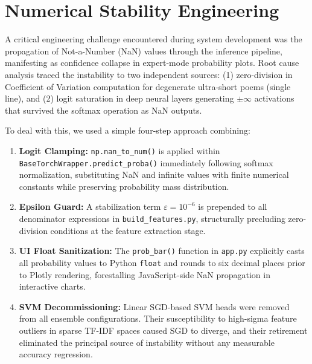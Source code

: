 \documentclass[conference]{IEEEtran}
\begin{document}
\section{Numerical Stability Engineering}
\label{sec:stability}

A critical engineering challenge encountered during system development
was the propagation of Not-a-Number (NaN) values through the inference
pipeline, manifesting as confidence collapse in expert-mode probability
plots. Root cause analysis traced the instability to two independent
sources: (1) zero-division in Coefficient of Variation computation for
degenerate ultra-short poems (single line), and (2) logit saturation in
deep neural layers generating $\pm\infty$ activations that survived the
softmax operation as NaN outputs.

To deal with this, we used a simple four-step approach combining:

\begin{enumerate}
\item \textbf{Logit Clamping:} \texttt{np.nan\_to\_num()} is applied
      within \texttt{BaseTorchWrapper.predict\_proba()} immediately
      following softmax normalization, substituting NaN and infinite
      values with finite numerical constants while preserving probability
      mass distribution.
\item \textbf{Epsilon Guard:} A stabilization term $\varepsilon =
      10^{-6}$ is prepended to all denominator expressions in
      \texttt{build\_features.py}, structurally precluding zero-division
      conditions at the feature extraction stage.
\item \textbf{UI Float Sanitization:} The \texttt{prob\_bar()} function
      in \texttt{app.py} explicitly casts all probability values to
      Python \texttt{float} and rounds to six decimal places prior to
      Plotly rendering, forestalling JavaScript-side NaN propagation in
      interactive charts.
\item \textbf{SVM Decommissioning:} Linear SGD-based SVM heads were
      removed from all ensemble configurations. Their susceptibility to
      high-sigma feature outliers in sparse TF-IDF spaces caused SGD
      to diverge, and their retirement eliminated the principal source
      of instability without any measurable accuracy regression.
\end{enumerate}
\end{document}
